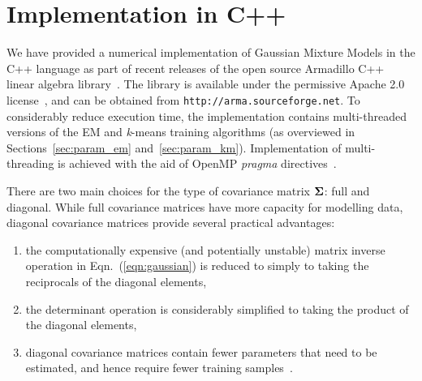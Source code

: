\section{Implementation in C++}
\label{sec:implementation}

We have provided a numerical implementation of Gaussian Mixture Models in the C++ language
as part of recent releases of the open source Armadillo C++ linear algebra library~\cite{Armadillo_JOSS_2016}. %
The library is available under the permissive Apache 2.0 license~\cite{Laurent_2008},
and can be obtained from
{\texttt{http://arma.sourceforge.net}}.
To considerably reduce execution time,
the implementation contains multi-threaded versions of the EM and {\it k}-means training algorithms
(as overviewed in Sections~\ref{sec:param_em} and~\ref{sec:param_km}).
Implementation of multi-threading is achieved with the aid of OpenMP {\it pragma} directives~\cite{OpenMP_2007}.


There are two main choices for the type of covariance matrix ${\boldsymbol{\Sigma}}$: full and diagonal.
While full covariance matrices have more capacity for modelling data,
diagonal covariance matrices provide several practical advantages:
%
\begin{enumerate}[{\bf (i)}]
\item
the computationally expensive (and potentially unstable) matrix inverse operation in Eqn.~(\ref{eqn:gaussian})
is reduced to simply to taking the reciprocals of the diagonal elements,

\item
the determinant operation is considerably simplified to taking the product of the diagonal elements,

\item
diagonal covariance matrices contain fewer parameters that need to be estimated, and hence require fewer training samples~\cite{Duda01}.
\end{enumerate}

